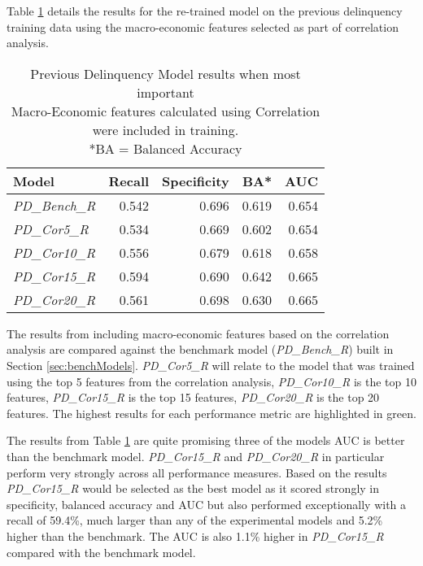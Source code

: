 Table \ref{table:PDCorrModelResults} details the results for the
re-trained model on the previous delinquency training data using the macro-economic features selected as part of correlation analysis.

\begin{table}[H]
\centering
\small
		\begin{tabular}{l r r r r}
			\hline
			\textbf{Model} & \textbf{Recall} & \textbf{Specificity} & \textbf{BA*} & \textbf{AUC}  \\ \hline
			\textit{PD\_Bench\_R} & 0.542 & 0.696 & 0.619 & 0.654 \\ \hline
			\textit{PD\_Cor5\_R}  & 0.534 & 0.669 & 0.602 & 0.654   \\ 
			\textit{PD\_Cor10\_R} & 0.556 & 0.679 & 0.618 & 0.658  \\ 
			\textit{PD\_Cor15\_R} & \cellcolor{green!25}0.594 & 0.690 & \cellcolor{green!25}0.642 & 0.665  \\
			\textit{PD\_Cor20\_R} & 0.561 & \cellcolor{green!25}0.698 & 0.630 & \cellcolor{green!25}0.665  \\\hline
		\end{tabular}
	\caption{Previous Delinquency Model results when most important \\Macro-Economic features calculated using Correlation were included in training.\\
		*BA = Balanced Accuracy}
	\label{table:PDCorrModelResults}
\end{table}

The results from including macro-economic features based on the correlation analysis are compared against the benchmark model (\textit{PD\_Bench\_R}) built in Section \ref{sec:benchModels}. \textit{PD\_Cor5\_R} will relate to the model that was trained using the top 5 features from the correlation analysis, \textit{PD\_Cor10\_R} is the top 10 features, \textit{PD\_Cor15\_R} is the top 15 features, \textit{PD\_Cor20\_R} is the top 20 features. The highest results for each performance metric are highlighted in green.

The results from Table \ref{table:PDCorrModelResults} are quite promising three of the models AUC is better than the benchmark model. \textit{PD\_Cor15\_R} and \textit{PD\_Cor20\_R} in particular perform very strongly across all performance measures. Based on the results \textit{PD\_Cor15\_R} would be selected as the best model as it scored strongly in specificity, balanced accuracy and AUC but also performed exceptionally with a recall of 59.4\%, much larger than any of the experimental models and 5.2\% higher than the benchmark. The AUC is also 1.1\% higher in \textit{PD\_Cor15\_R} compared with the benchmark model.


